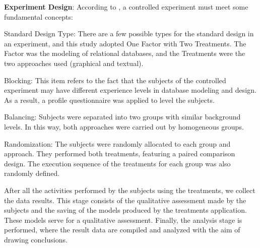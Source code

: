 \documentclass[a4paper,twoside,anonymous]{article}
\begin{document}

\textbf{Experiment Design}: According to \citet{Wohlin:2012}, a controlled experiment must meet some fundamental concepts:
\begin{inparaenum}[(i)]
\item Standard Design Type: 
There are a few possible types for the standard design in an experiment, and this study adopted One Factor with Two Treatments.
The Factor was the modeling of relational databases, and the Treatments were the two approaches used (graphical and textual).
\item Blocking: 
This item refers to the fact that the subjects of the controlled experiment may have different experience levels in database modeling and design.
As a result, a profile questionnaire was applied to level the subjects.
\item Balancing: 
Subjects were separated into two groups with similar background levels.
In this way, both approaches were carried out by homogeneous groups.
\item Randomization: 
The subjects were randomly allocated to each group and approach.
They performed both treatments, featuring a paired comparison design.
The execution sequence of the treatments for each group was also randomly defined.
\end{inparaenum}

After all the activities performed by the subjects using the treatments, we collect the data results.
This stage consists of the qualitative assessment made by the subjects and the saving of the models produced by the treatments application.
These models serve for a qualitative assessment.
Finally, the analysis stage is performed, where the result data are compiled and analyzed with the aim of drawing conclusions.

\end{document}
